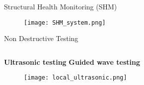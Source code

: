 \documentclass[10pt,aspectratio=169,dvipsnames]{beamer} %
\begin{document}
	\begin{frame}{Structural Health Monitoring (SHM)}
		\begin{figure}
			\texttt{[image: SHM\_system.png]}
		\end{figure}
	\end{frame}
	
	\begin{frame}{Non Destructive Testing}
		\begin{columns}[T]
			\begin{column}[c]{0.65\textwidth}				
				\textbf{Ultrasonic testing} \hspace{50pt} \textbf{Guided wave testing}
				\begin{figure}
					\texttt{[image: local\_ultrasonic.png]}
				\end{figure}
			\end{column}		
		\end{columns}	
	\end{frame}
\end{document}
